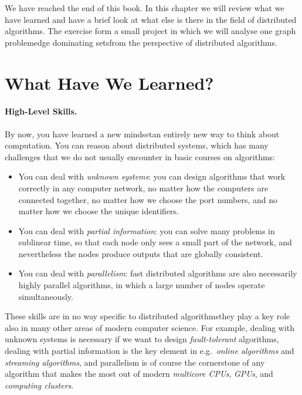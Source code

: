 
We have reached the end of this book. In this chapter we will review what we have learned and have a brief look at what else is there in the field of distributed algorithms. The exercise form a small project in which we will analyse one graph problem\mydash edge dominating sets\mydash from the perspective of distributed algorithms.


\section{What Have We Learned?}

\paragraph{High-Level Skills.}

By now, you have learned a new mindset\mydash an entirely new way to think about computation. You can reason about distributed systems, which has many challenges that we do not usually encounter in basic courses on algorithms:
\begin{itemize}
    \item You can deal with \emph{unknown systems}: you can design algorithms that work correctly in any computer network, no matter how the computers are connected together, no matter how we choose the port numbers, and no matter how we choose the unique identifiers.
    \item You can deal with \emph{partial information}: you can solve many problems in sublinear time, so that each node only sees a small part of the network, and nevertheless the nodes produce outputs that are globally consistent.
    \item You can deal with \emph{parallelism}: fast distributed algorithms are also necessarily highly parallel algorithms, in which a large number of nodes operate simultaneously.
\end{itemize}
These skills are in no way specific to distributed algorithms\mydash they play a key role also in many other areas of modern computer science. For example, dealing with unknown systems is necessary if we want to design \emph{fault-tolerant} algorithms, dealing with partial information is the key element in e.g.\ \emph{online algorithms} and \emph{streaming algorithms}, and parallelism is of course the cornerstone of any algorithm that makes the most out of modern \emph{multicore CPUs}, \emph{GPUs}, and \emph{computing clusters}.


